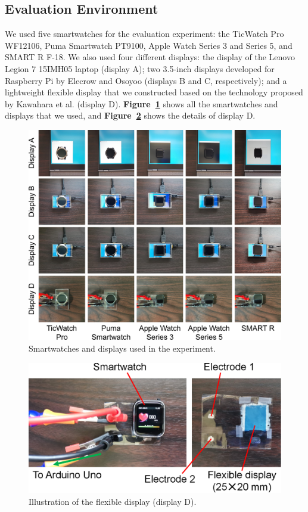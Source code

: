 \documentclass[manuscript,screen,review]{acmart}
\newcommand\figref[1]{\textbf{Figure~\ref{fig:#1}}}
\begin{document}
\subsection{Evaluation Environment}
We used five smartwatches for the evaluation experiment: the TicWatch Pro WF12106, Puma Smartwatch PT9100, Apple Watch Series 3 and Series 5, and SMART R F-18. We also used four different displays: the display of the Lenovo Legion 7 15IMH05 laptop (display A); two 3.5-inch displays developed for Raspberry Pi by Elecrow and Osoyoo (displays B and C, respectively); and a lightweight flexible display that we constructed based on the technology proposed by Kawahara et al. \cite{flexible_display} (display D). \figref{smartwatches} shows all the smartwatches and displays that we used, and \figref{flexible} shows the details of display D.

\begin{figure}[!t]
  \centering
  \includegraphics[width=1\linewidth]{figures/smartwatches.eps}
  \caption{Smartwatches and displays used in the experiment.}
  \label{fig:smartwatches}
\end{figure}

\begin{figure}[!t]
  \centering
  \includegraphics[width=1\linewidth]{figures/flexible.eps}
  \caption{Illustration of the flexible display (display D).}
  \label{fig:flexible}
\end{figure}
\end{document}
